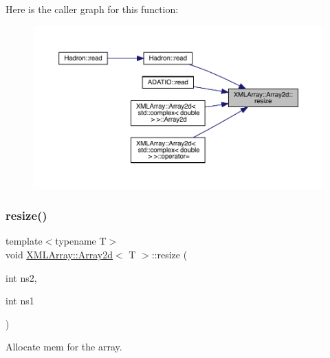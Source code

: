 Here is the caller graph for this function\+:
\nopagebreak
\begin{figure}[H]
\begin{center}
\leavevmode
\includegraphics[width=350pt]{dc/ddc/classXMLArray_1_1Array2d_a64001cb2aac062d2179a0285b0279244_icgraph}
\end{center}
\end{figure}
\mbox{\label{classXMLArray_1_1Array2d_a64001cb2aac062d2179a0285b0279244}} 
\subsubsection{\texorpdfstring{resize()}{resize()}\hspace{0.1cm}{\footnotesize\ttfamily [3/3]}}
{\footnotesize\ttfamily template$<$typename T$>$ \\
void \mbox{\hyperlink{classXMLArray_1_1Array2d}{X\+M\+L\+Array\+::\+Array2d}}$<$ T $>$\+::resize (\begin{DoxyParamCaption}\item[{int}]{ns2,  }\item[{int}]{ns1 }\end{DoxyParamCaption})\hspace{0.3cm}{\ttfamily [inline]}}



Allocate mem for the array. 

\mbox{\label{classXMLArray_1_1Array2d_a0f5dd764b391ddffd3d89c71bbc6c614}} 
